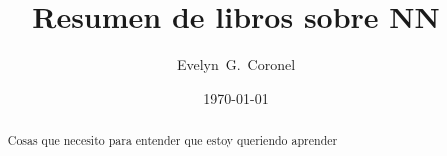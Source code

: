 



\title{Resumen de libros sobre NN}
\author{Evelyn~G.~Coronel}


\date[]{\lowercase{\today}} %

\begin{abstract}
Cosas que necesito para entender que estoy queriendo aprender
\end{abstract} 
\maketitle



